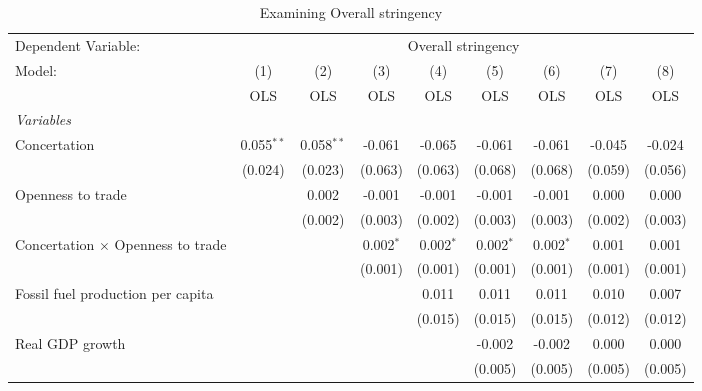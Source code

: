 
\begin{table}[htbp]
   \caption{Examining Overall stringency}
   \centering
   \begin{tabular}{lcccccccc}
      \toprule
      Dependent Variable: & \multicolumn{8}{c}{Overall stringency}\\
      Model:                                   & (1)          & (2)          & (3)         & (4)         & (5)         & (6)         & (7)     & (8)\\  
                                               &  OLS         & OLS          & OLS         & OLS         & OLS         & OLS         & OLS     & OLS\\  
      \midrule
      \emph{Variables}\\
      Concertation                             & 0.055$^{**}$ & 0.058$^{**}$ & -0.061      & -0.065      & -0.061      & -0.061      & -0.045  & -0.024\\   
                                               & (0.024)      & (0.023)      & (0.063)     & (0.063)     & (0.068)     & (0.068)     & (0.059) & (0.056)\\   
      Openness to trade                        &              & 0.002        & -0.001      & -0.001      & -0.001      & -0.001      & 0.000   & 0.000\\   
                                               &              & (0.002)      & (0.003)     & (0.002)     & (0.003)     & (0.003)     & (0.002) & (0.003)\\   
      Concertation $\times$ Openness to trade  &              &              & 0.002$^{*}$ & 0.002$^{*}$ & 0.002$^{*}$ & 0.002$^{*}$ & 0.001   & 0.001\\   
                                               &              &              & (0.001)     & (0.001)     & (0.001)     & (0.001)     & (0.001) & (0.001)\\   
      Fossil fuel production per capita        &              &              &             & 0.011       & 0.011       & 0.011       & 0.010   & 0.007\\   
                                               &              &              &             & (0.015)     & (0.015)     & (0.015)     & (0.012) & (0.012)\\   
      Real GDP growth                          &              &              &             &             & -0.002      & -0.002      & 0.000   & 0.000\\   
                                               &              &              &             &             & (0.005)     & (0.005)     & (0.005) & (0.005)\\   

\end{tabular}
\end{table}
